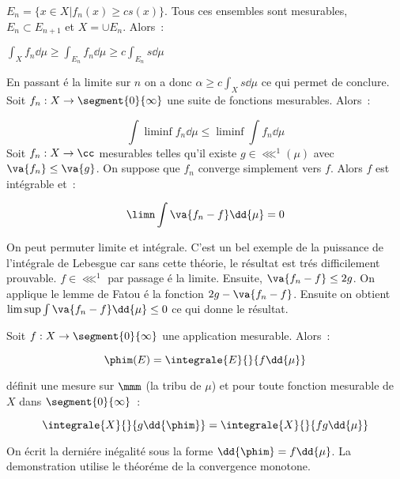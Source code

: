 $E_n = \lbrace x\in X\lvert f_n(x)\geq c s(x)\rbrace$. Tous ces ensembles sont mesurables, $E_n\subset E_{n+1}$ et
$X = \cup E_n$. Alors~:\par
$\int_X f_n\dd{\mu} \geq \int_{E_n}f_n\dd{\mu}\geq c\int_{E_n} s\dd{\mu}$\par
En passant é la limite sur $n$ on a donc $\alpha\geq c\int_{X}s\dd{\mu}$ ce qui permet de conclure. 
 Soit $f_n : X\to\segment{0}{\infty}$ une suite de fonctions mesurables. Alors~:\par
$$\int \liminf f_n\dd{\mu}\leq \liminf\int f_n\dd{\mu}$$ 
Soit $f_n:X\to\cc$ mesurables telles qu'il existe $g\in\lll^1(\mu)$ avec $\va{f_n}\leq\va{g}$. On suppose que 
$f_n$ converge simplement vers $f$. Alors $f$ est intégrable et~:\par
$$\limn \int \va{f_n - f}\dd{\mu} = 0$$\par
On peut permuter limite et intégrale.
\rmq C'est un bel exemple de la puissance de l'intégrale de Lebesgue car sans cette théorie, le résultat est trés 
difficilement prouvable.
\dem $f\in\lll^1$ par passage é la limite. Ensuite, $\va{f_n -f}\leq 2g$. On applique le lemme de Fatou é la fonction 
$2g - \va{f_n -f}$. Ensuite on obtient\newline
$\limsup \int \va{f_n-f}\dd{\mu}\leq 0$ ce qui donne le résultat.

\theoreme{} Soit $f:X\to\segment{0}{\infty}$ une application mesurable. Alors~:\par
$$\phim(E) = \integrale{E}{}{f\dd{\mu}}$$\par
définit une mesure sur $\mmm$ (la tribu de $\mu$) et pour toute fonction mesurable de $X$ dans $\segment{0}{\infty}$~:\par
$$\integrale{X}{}{g\dd{\phim}} = \integrale{X}{}{fg\dd{\mu}}$$\par
On écrit la derniére inégalité sous la forme $\dd{\phim} = f\dd{\mu}$. La demonstration utilise le théoréme de la 
convergence monotone.

